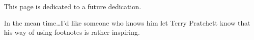 
 {}

\vspace{2in}

\large 
\begin{center}
This page is dedicated to a future dedication.

\vspace{4cm}

\small{In the mean time\dots I'd like someone who knows him let Terry
Pratchett know that his way of using footnotes is rather inspiring.}

\end{center}
\newpage



\thispagestyle{headings}
\pagestyle{headings}
